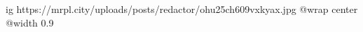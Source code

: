  
 
 
 
 

\ifcmt
  ig https://mrpl.city/uploads/posts/redactor/ohu25ch609vxkyax.jpg
  @wrap center
  @width 0.9
\fi
